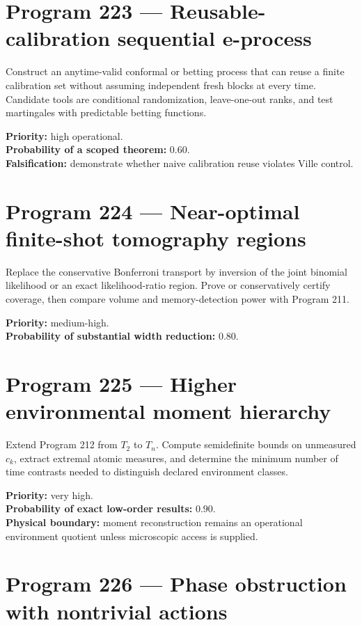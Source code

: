 \documentclass[11pt,a4paper,openany]{report}
\begin{document}
\section{Program 223 --- Reusable-calibration sequential e-process}

Construct an anytime-valid conformal or betting process that can reuse a finite calibration set without assuming independent fresh blocks at every time. Candidate tools are conditional randomization, leave-one-out ranks, and test martingales with predictable betting functions.

\textbf{Priority:} high operational.\\
\textbf{Probability of a scoped theorem:} \(0.60\).\\
\textbf{Falsification:} demonstrate whether naive calibration reuse violates Ville control.

\section{Program 224 --- Near-optimal finite-shot tomography regions}

Replace the conservative Bonferroni transport by inversion of the joint binomial likelihood or an exact likelihood-ratio region. Prove or conservatively certify coverage, then compare volume and memory-detection power with Program 211.

\textbf{Priority:} medium-high.\\
\textbf{Probability of substantial width reduction:} \(0.80\).

\section{Program 225 --- Higher environmental moment hierarchy}

Extend Program 212 from \(T_2\) to \(T_n\). Compute semidefinite bounds on unmeasured \(c_k\), extract extremal atomic measures, and determine the minimum number of time contrasts needed to distinguish declared environment classes.

\textbf{Priority:} very high.\\
\textbf{Probability of exact low-order results:} \(0.90\).\\
\textbf{Physical boundary:} moment reconstruction remains an operational environment quotient unless microscopic access is supplied.

\section{Program 226 --- Phase obstruction with nontrivial actions}
\end{document}
